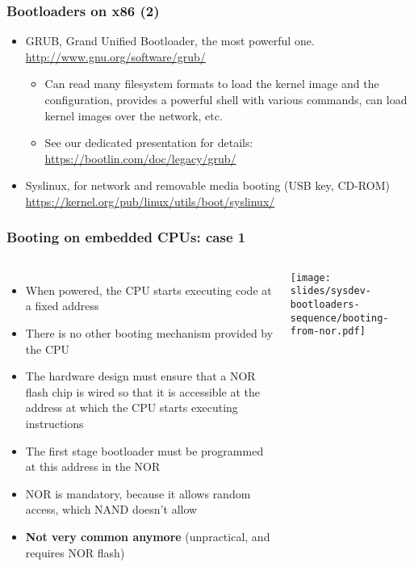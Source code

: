 \begin{frame}
  \frametitle{Bootloaders on x86 (2)}
  \begin{itemize}
  \item GRUB, Grand Unified Bootloader, the most powerful one.\\
    \url{http://www.gnu.org/software/grub/}
    \begin{itemize}
    \item Can read many filesystem formats to load the kernel image
      and the configuration, provides a powerful shell with various
      commands, can load kernel images over the network, etc.
    \item See our dedicated presentation for details:\\
      \url{https://bootlin.com/doc/legacy/grub/}
    \end{itemize}
  \item Syslinux, for network and removable media booting (USB key, CD-ROM)\\
    \small\url{https://kernel.org/pub/linux/utils/boot/syslinux/}\normalsize
  \end{itemize}
\end{frame}

\begin{frame}
  \frametitle{Booting on embedded CPUs: case 1}
  \begin{columns}
    \begin{itemize}
    \item When powered, the CPU starts executing code at a fixed address
    \item There is no other booting mechanism provided by the CPU
    \item The hardware design must ensure that a NOR flash chip is
      wired so that it is accessible at the address at which the CPU
      starts executing instructions
    \item The first stage bootloader must be programmed at this
      address in the NOR
    \item NOR is mandatory, because it allows random access, which
      NAND doesn't allow
    \item {\bf Not very common anymore} (unpractical, and requires NOR
      flash)
    \end{itemize}
    \texttt{[image: slides/sysdev-bootloaders-sequence/booting-from-nor.pdf]}
  \end{columns}
\end{frame}


